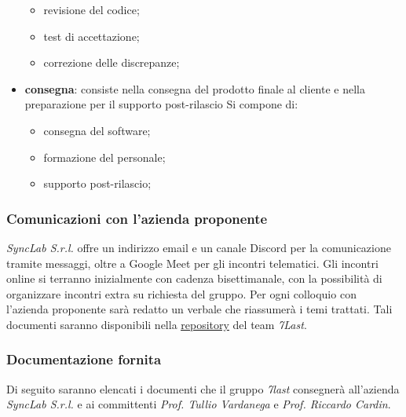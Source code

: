\begin{itemize}
		\begin{itemize}
			\item revisione del codice;
			\item test di accettazione;
			\item correzione delle discrepanze;
		\end{itemize}
	\item \textbf{consegna}: consiste nella consegna del prodotto finale al cliente e nella preparazione per il supporto post-rilascio Si compone di:
		\begin{itemize}
			\item consegna del software;
			\item formazione del personale;
			\item supporto post-rilascio;
		\end{itemize}
\end{itemize}

\subsubsection{Comunicazioni con l'azienda proponente}
\textit{SyncLab S.r.l.} offre un indirizzo email e un canale Discord per la comunicazione tramite messaggi, oltre a Google Meet per gli incontri telematici. Gli incontri online si terranno inizialmente con cadenza bisettimanale, con la possibilità di organizzare incontri extra su richiesta del gruppo. Per ogni colloquio con l’azienda proponente sarà redatto un verbale che riassumerà i temi trattati. Tali documenti saranno disponibili nella \href{https://github.com/7Last/docs}{\underline{repository}} del team \textit{7Last}.
\newpage
\subsubsection{Documentazione fornita}
Di seguito saranno elencati i documenti che il gruppo \textit{7last} consegnerà all'azienda \textit{SyncLab S.r.l.} e ai committenti \textit{Prof. Tullio Vardanega} e \textit{Prof. Riccardo Cardin}.

